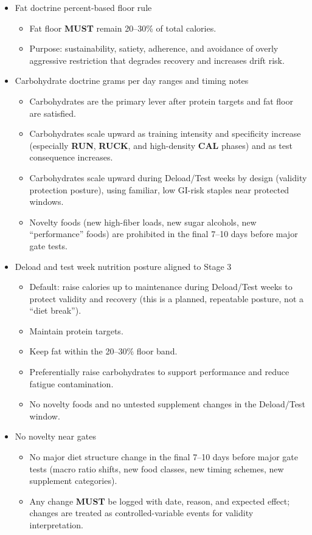 \documentclass[10pt]{article}
\begin{document}
\begin{itemize}
\item Fat doctrine percent-based floor rule
  \begin{itemize}
  \item Fat floor \textbf{MUST} remain 20–30\% of total calories.
  \item Purpose: sustainability, satiety, adherence, and avoidance of overly aggressive restriction that degrades recovery and increases drift risk.
  \end{itemize}

\item Carbohydrate doctrine grams per day ranges and timing notes
  \begin{itemize}
  \item Carbohydrates are the primary lever after protein targets and fat floor are satisfied.
  \item Carbohydrates scale upward as training intensity and specificity increase (especially \textbf{RUN}, \textbf{RUCK}, and high-density \textbf{CAL} phases) and as test consequence increases.
  \item Carbohydrates scale upward during Deload/Test weeks by design (validity protection posture), using familiar, low GI-risk staples near protected windows.
  \item Novelty foods (new high-fiber loads, new sugar alcohols, new “performance” foods) are prohibited in the final 7–10 days before major gate tests.
  \end{itemize}

\newpage
\item Deload and test week nutrition posture aligned to Stage 3
  \begin{itemize}
  \item Default: raise calories up to maintenance during Deload/Test weeks to protect validity and recovery (this is a planned, repeatable posture, not a “diet break”).
  \item Maintain protein targets.
  \item Keep fat within the 20–30\% floor band.
  \item Preferentially raise carbohydrates to support performance and reduce fatigue contamination.
  \item No novelty foods and no untested supplement changes in the Deload/Test window.
  \end{itemize}

\item No novelty near gates
  \begin{itemize}
  \item No major diet structure change in the final 7–10 days before major gate tests (macro ratio shifts, new food classes, new timing schemes, new supplement categories).
  \item Any change \textbf{MUST} be logged with date, reason, and expected effect; changes are treated as controlled-variable events for validity interpretation.
  \end{itemize}


\end{itemize}
\end{document}
